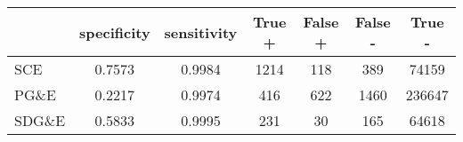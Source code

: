 \begin{tabular}{lcccccc}
\toprule
{} &  specificity &  sensitivity &  True + &  False + &  False - &  True - \\
\midrule
SCE   &       0.7573 &       0.9984 &    1214 &      118 &      389 &   74159 \\
PG\&E  &       0.2217 &       0.9974 &     416 &      622 &     1460 &  236647 \\
SDG\&E &       0.5833 &       0.9995 &     231 &       30 &      165 &   64618 \\
\bottomrule
\end{tabular}
